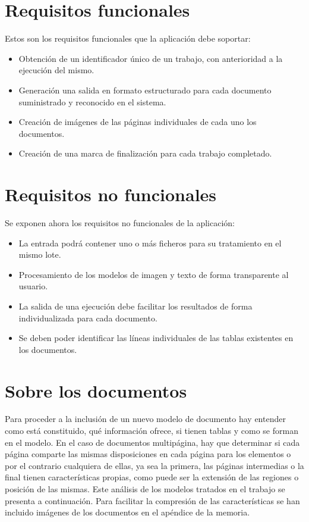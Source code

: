 \section{Requisitos funcionales}

Estos son los requisitos funcionales que la aplicación debe soportar:

\begin{itemize}
	\item Obtención de un identificador único de un trabajo, con anterioridad a la ejecución del mismo.
	\item Generación una salida en formato estructurado para cada documento suministrado y reconocido en el sistema.
	\item Creación de imágenes de las páginas individuales de cada uno los documentos.
	\item Creación de una marca de finalización para cada trabajo completado.
\end{itemize}


\section{Requisitos no funcionales}

Se exponen ahora los requisitos no funcionales de la aplicación:

\begin{itemize}
	\item La entrada podrá contener uno o más ficheros para su tratamiento en el mismo lote.
	\item Procesamiento de los modelos de imagen y texto de forma transparente al usuario.
	\item La salida de una ejecución debe facilitar los resultados de forma individualizada para cada documento.
	\item Se deben poder identificar las líneas individuales de las tablas existentes en los documentos.
\end{itemize}

\section{Sobre los documentos}

Para proceder a la inclusión de un nuevo modelo de documento hay entender como está constituido, qué información ofrece, si tienen tablas y como se forman en el modelo. En el caso de documentos multipágina, hay que determinar si cada página comparte las mismas disposiciones en cada página para los elementos o por el contrario cualquiera de ellas, ya sea la primera, las páginas intermedias o la final tienen características propias, como puede ser la extensión de las regiones o posición de las mismas. Este análisis de los modelos tratados en el trabajo se presenta a continuación. Para facilitar la compresión de las características se han incluido imágenes de los documentos en el apéndice de la memoria.

